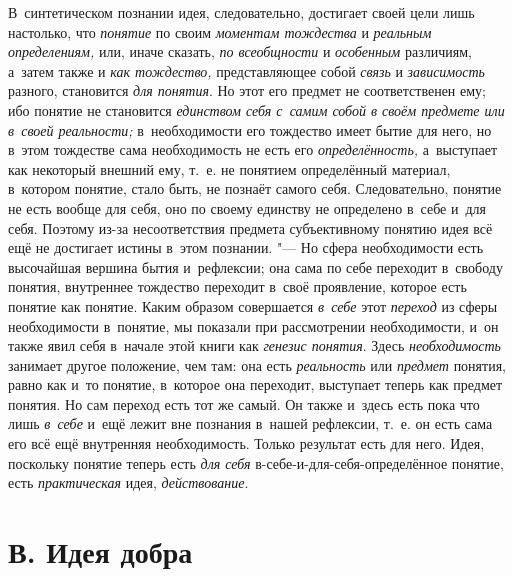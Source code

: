 В~синтетическом познании идея, следовательно, достигает своей
цели лишь настолько, что {\em понятие}
по своим {\em моментам
тождества} и
{\em реальным определениям,}
или, иначе сказать,
{\em по всеобщности} и
{\em особенным}
различиям, а~затем также и
{\em как тождество,}
представляющее собой
{\em связь} и
{\em зависимость}
разного, становится
{\em для понятия}. Но
этот его предмет не соответственен ему; ибо понятие не становится
{\em единством себя с~самим собой в
своём предмете или в~своей реальности;} в~необходимости его
тождество имеет бытие для него, но в~этом тождестве сама необходимость не
есть его {\em определённость,}
а~выступает как некоторый внешний ему, т.~е. не понятием
определённый материал, в~котором понятие, стало быть, не познаёт самого
себя. Следовательно, понятие не есть вообще для себя, оно по своему
единству не определено в~себе и~для себя. Поэтому из-за несоответствия
предмета субъективному понятию идея всё ещё не достигает
истины в~этом познании. "--- Но сфера необходимости есть
высочайшая вершина бытия и~рефлексии; она сама по себе переходит в~свободу
понятия, внутреннее тождество переходит в~своё проявление, которое есть
понятие как понятие. Каким образом совершается
{\em в~себе} этот
{\em переход} из сферы
необходимости в~понятие, мы показали при рассмотрении необходимости, и~он
также явил себя в~начале этой книги как
{\em генезис понятия}.
Здесь {\em необходимость}
занимает другое положение, чем там: она есть
{\em реальность} или
{\em предмет} понятия,
равно как и~то понятие, в~которое она переходит, выступает теперь как
предмет понятия. Но сам переход есть тот же самый. Он также и~здесь есть
пока что лишь {\em в~себе}
и~ещё лежит вне познания в~нашей рефлексии, т.~е. он есть
сама его всё ещё внутренняя необходимость. Только результат есть для него.
Идея, поскольку понятие теперь есть
{\em для себя}
в-себе-и-для-себя-определённое понятие, есть
{\em практическая} идея,
{\em действование}.

\section[В. Идея добра]{В. Идея добра}

